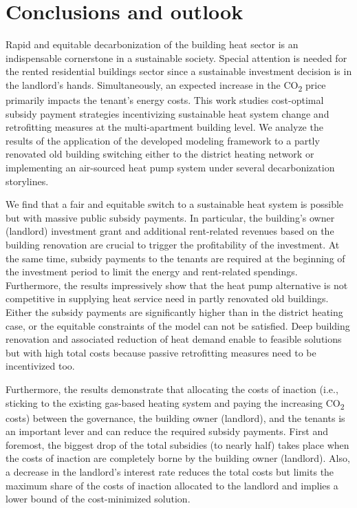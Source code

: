\section{Conclusions and outlook}\label{conclusions}
Rapid and equitable decarbonization of the building heat sector is an indispensable cornerstone in a sustainable society. Special attention is needed for the rented residential buildings sector since a sustainable investment decision is in the landlord's hands. Simultaneously, an expected increase in the CO\textsubscript{2} price primarily impacts the tenant's energy costs. This work studies cost-optimal subsidy payment strategies incentivizing sustainable heat system change and retrofitting measures at the multi-apartment building level. We analyze the results of the application of the developed modeling framework to a partly renovated old building switching either to the district heating network or implementing an air-sourced heat pump system under several decarbonization storylines.\vspace{0.5cm}

We find that a fair and equitable switch to a sustainable heat system is possible but with massive public subsidy payments. In particular, the building's owner (landlord) investment grant and additional rent-related revenues based on the building renovation are crucial to trigger the profitability of the investment. At the same time, subsidy payments to the tenants are required at the beginning of the investment period to limit the energy and rent-related spendings. Furthermore, the results impressively show that the heat pump alternative is not competitive in supplying heat service need in partly renovated old buildings. Either the subsidy payments are significantly higher than in the district heating case, or the equitable constraints of the model can not be satisfied. Deep building renovation and associated reduction of heat demand enable to feasible solutions but with high total costs because passive retrofitting measures need to be incentivized too.\vspace{0.5cm}

Furthermore, the results demonstrate that allocating the costs of inaction (i.e., sticking to the existing gas-based heating system and paying the increasing CO\textsubscript{2} costs) between the governance, the building owner (landlord), and the tenants is an important lever and can reduce the required subsidy payments. First and foremost, the biggest drop of the total subsidies (to nearly half) takes place when the costs of inaction are completely borne by the building owner (landlord). Also, a decrease in the landlord's interest rate reduces the total costs but limits the maximum share of the costs of inaction allocated to the landlord and implies a lower bound of the cost-minimized solution.\vspace{0.5cm}

